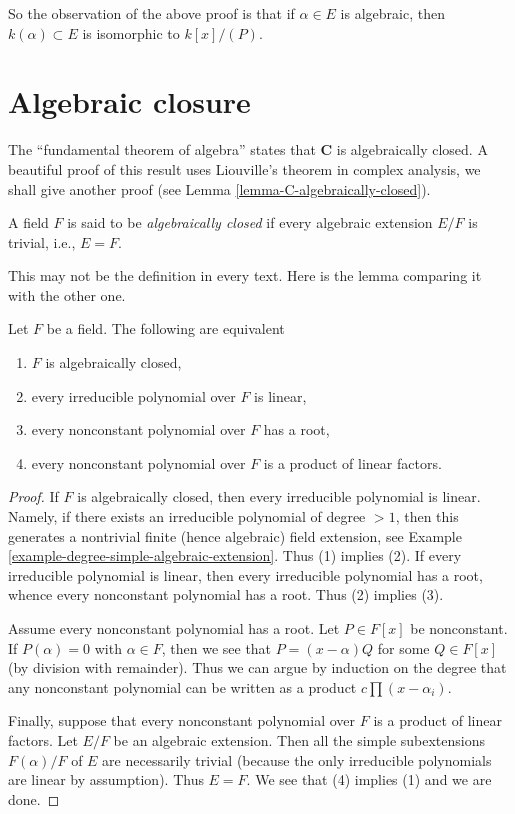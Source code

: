 \noindent
So the observation of the above proof is that if $\alpha \in E$ is algebraic,
then $k(\alpha) \subset E$ is isomorphic to $k[x]/(P)$.


\section{Algebraic closure}
\label{section-algebraic-closure}

\noindent
The ``fundamental theorem of algebra'' states that $\mathbf{C}$ is
algebraically closed. A beautiful proof of this result uses
Liouville's theorem in complex analysis, we shall give another
proof (see Lemma \ref{lemma-C-algebraically-closed}).

\begin{definition}
\label{definition-algebraically-closed}
A field $F$ is said to be {\it algebraically closed} if every algebraic
extension $E/F$ is trivial, i.e., $E = F$.
\end{definition}

\noindent
This may not be the definition in every text. Here is the lemma comparing
it with the other one.

\begin{lemma}
\label{lemma-algebraically-closed}
Let $F$ be a field. The following are equivalent
\begin{enumerate}
\item $F$ is algebraically closed,
\item every irreducible polynomial over $F$ is linear,
\item every nonconstant polynomial over $F$ has a root,
\item every nonconstant polynomial over $F$ is a product of linear factors.
\end{enumerate}
\end{lemma}

\begin{proof}
If $F$ is algebraically closed, then every irreducible polynomial is linear.
Namely, if there exists an irreducible polynomial of degree $> 1$, then
this generates a nontrivial finite (hence algebraic) field extension, see
Example \ref{example-degree-simple-algebraic-extension}.
Thus (1) implies (2). If every irreducible polynomial
is linear, then every irreducible polynomial has a root, whence every
nonconstant polynomial has a root. Thus (2) implies (3).

\medskip\noindent
Assume every nonconstant polynomial has a root. Let $P \in F[x]$
be nonconstant. If $P(\alpha) = 0$ with $\alpha \in F$, then we see
that $P = (x - \alpha)Q$ for some $Q \in F[x]$ (by division with remainder).
Thus we can argue by induction on the degree that any nonconstant
polynomial can be written as a product $c \prod (x - \alpha_i)$.

\medskip\noindent
Finally, suppose that every nonconstant polynomial over $F$ is a product of
linear factors. Let $E/F$ be an algebraic extension. Then all the simple
subextensions $F(\alpha)/F$ of $E$ are necessarily trivial (because the
only irreducible polynomials are linear by assumption). Thus $E = F$.
We see that (4) implies (1) and we are done.
\end{proof}

